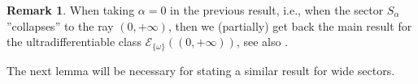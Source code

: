 \documentclass[11pt,a4paper]{article}
\theoremstyle{plain}
\theoremstyle{definition}
\newtheorem{remark}[proposition]{Remark}
\newcommand{\red}[1]{{\color{red}#1}}
\begin{document}
\begin{remark}
When taking $\alpha=0$ in the previous result, i.e., when the sector $S_{\alpha}$ ''collapses'' to the ray $(0,+\infty)$, then we (partially) get back the main result \cite[Thm. 3]{characterizationstabilitypaper} for the ultradifferentiable class $\mathcal{E}_{\{\omega\}}((0,+\infty))$, see also \cite[Thm. 6.3]{compositionpaper}.
\end{remark}




The next lemma will be necessary for stating a similar result for wide sectors.
\end{document}
